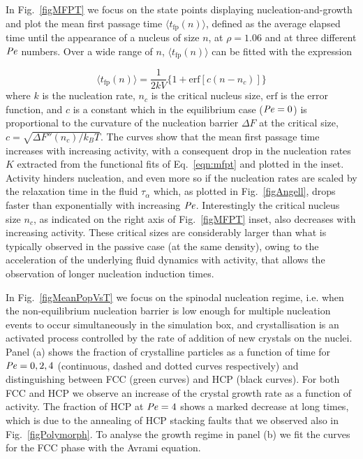 In Fig.~\ref{figMFPT} we focus on the state points displaying nucleation-and-growth and plot the mean first passage time $\langle t_\text{fp}(n)\rangle$, defined as the average elapsed time until the appearance of a nucleus of size $n$, %
at $\rho=1.06$ and at three different $\operatorname{\mathit{P\kern-.08em e}}$ numbers. Over a wide range of $n$, $\langle t_\text{fp}(n)\rangle$ can be fitted with the expression

\begin{equation}\label{eqn:mfpt}
\langle t_\text{fp}(n)\rangle = \frac{1}{2 k V} \{1+\text{erf} \left[c(n-n_c)\right]\}
\end{equation}
where $k$ is the nucleation rate, $n_c$ is the critical nucleus size, $\text{erf}$ is the error function, and $c$ is a constant which in the equilibrium case ($\operatorname{\mathit{P\kern-.08em e}}=0$) is proportional to the curvature of the nucleation barrier $\Delta F$ at the critical size, $c=\sqrt{\Delta F''(n_c)/k_BT}$.
The curves show that the mean first passage time increases with increasing activity, with a consequent drop in the nucleation rates $K$ extracted from the functional fits of Eq.~\ref{eqn:mfpt} and plotted in the inset. Activity hinders nucleation, and even more so if the nucleation rates are scaled by the relaxation time in the fluid $\tau_\alpha$ which, as plotted in Fig.~\ref{figAngell}, drops faster than exponentially with increasing $\operatorname{\mathit{P\kern-.08em e}}$. Interestingly the critical nucleus size $n_c$, as indicated on the right axis %
of Fig.~\ref{figMFPT} inset, also decreases with increasing activity. These critical sizes are considerably larger than what is typically observed in the passive case (at the same density), owing to the acceleration of the underlying fluid dynamics with activity, that allows the observation of longer nucleation induction times.


In Fig.~\ref{figMeanPopVsT} we focus on the spinodal nucleation regime, i.e. when the non-equilibrium nucleation barrier is low enough for multiple nucleation events to occur simultaneously in the simulation box, and crystallisation is an activated process controlled by the rate of addition of new crystals on the nuclei. Panel (a) shows the fraction of crystalline particles as a function of time for $\operatorname{\mathit{P\kern-.08em e}}=0,2,4$ (continuous, dashed and dotted curves respectively) and distinguishing between FCC (green curves) and HCP (black curves). For both FCC and HCP we observe an increase of the crystal growth rate as a function of activity. The fraction of HCP at $\operatorname{\mathit{P\kern-.08em e}}=4$ shows a marked decrease at long times, which is due to the annealing of HCP stacking faults that we observed also in Fig.~\ref{figPolymorph}. To analyse the growth regime in panel (b) we fit the curves for the FCC phase with the Avrami equation.


